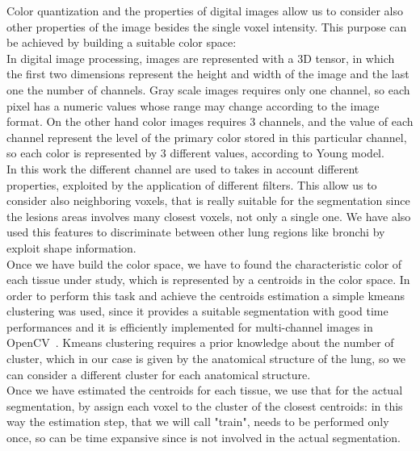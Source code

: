 \documentclass{standalone}
\begin{document}
	Color quantization and the properties of digital images allow us to consider also other properties of the image besides the single voxel intensity.
	This purpose can be achieved by building a suitable color space: \\
	In digital image processing, images are represented with a 3D tensor, in which the first two dimensions represent the height and width of the image 
	and the last one the number of channels. Gray scale images requires only one channel, so each pixel has a numeric values whose range may change 
	according to the image format. On the other hand color images requires 3 channels, and the value of each channel represent the level of the primary 
	color stored in this particular channel, so each color is represented by 3 different values, according to Young model. \\
	In this work the different channel are used to takes in account different properties, exploited by the application of different filters. This allow us to consider also neighboring voxels, that is really suitable for the segmentation since the  lesions areas involves many closest voxels, not only a single one. We have also used this features to discriminate between other lung regions like bronchi by exploit shape information.\\
	
	Once we have build the color space, we have to found the characteristic color of each tissue under study, which is represented by a centroids in the color space. In order to perform this task and achieve the centroids estimation a simple kmeans clustering was used, since it provides a suitable segmentation with good time performances and it is efficiently implemented for multi-channel images in OpenCV~\cite{OpenCV}. 
	Kmeans clustering requires a prior knowledge about the number of cluster, which in our case is given by the anatomical structure of the lung, so we can consider a different cluster for each anatomical structure.\\
	Once we have estimated the centroids for each tissue, we use that for the actual segmentation, by assign each voxel to the cluster of the closest centroids: in this way the estimation step, that we will call "train", needs to be performed only once, so can be time expansive since is not involved in the actual segmentation.\\


	
	
	
	

	
	
\end{document}
